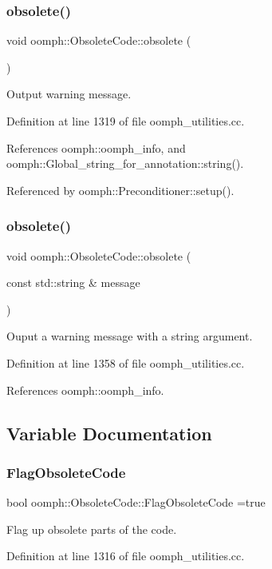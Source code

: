 \subsubsection{\texorpdfstring{obsolete()}{obsolete()}\hspace{0.1cm}{\footnotesize\ttfamily [1/2]}}
{\footnotesize\ttfamily void oomph\+::\+Obsolete\+Code\+::obsolete (\begin{DoxyParamCaption}{ }\end{DoxyParamCaption})}



Output warning message. 



Definition at line 1319 of file oomph\+\_\+utilities.\+cc.



References oomph\+::oomph\+\_\+info, and oomph\+::\+Global\+\_\+string\+\_\+for\+\_\+annotation\+::string().



Referenced by oomph\+::\+Preconditioner\+::setup().

\mbox{\label{namespaceoomph_1_1ObsoleteCode_a4c85cdf85330cfc731338a8365a1a780}} 
\subsubsection{\texorpdfstring{obsolete()}{obsolete()}\hspace{0.1cm}{\footnotesize\ttfamily [2/2]}}
{\footnotesize\ttfamily void oomph\+::\+Obsolete\+Code\+::obsolete (\begin{DoxyParamCaption}\item[{const std\+::string \&}]{message }\end{DoxyParamCaption})}



Ouput a warning message with a string argument. 



Definition at line 1358 of file oomph\+\_\+utilities.\+cc.



References oomph\+::oomph\+\_\+info.



\subsection{Variable Documentation}
\mbox{\label{namespaceoomph_1_1ObsoleteCode_ab78899d2d2bb1a3b5155990811edd717}} 
\subsubsection{\texorpdfstring{Flag\+Obsolete\+Code}{FlagObsoleteCode}}
{\footnotesize\ttfamily bool oomph\+::\+Obsolete\+Code\+::\+Flag\+Obsolete\+Code =true}



Flag up obsolete parts of the code. 



Definition at line 1316 of file oomph\+\_\+utilities.\+cc.

